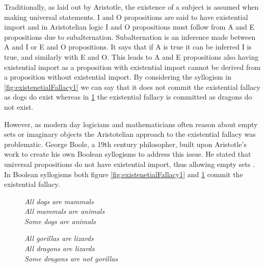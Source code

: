 \documentclass[12pt,a4paper]{report}
\newenvironment{tightcenter}{%
  \setlength\topsep{0pt}
  \setlength\parskip{0pt}
  \begin{center}
}{%
  \end{center}
}
\begin{document}
Traditionally, as laid out by Aristotle, the existence of a subject is assumed when making universal statements. I and O propositions are said to have existential import and in Aristotelian logic I and O propositions must follow from A and E propositions due to subalternation. Subalternation is an inference made between A and I or E and O propositions. It says that if A is true it can be inferred I is true, and similarly with E and O. This leads to A and E propositions also having existential import as a proposition with existential import cannot be derived from a proposition without existential import.
By considering the syllogism in \ref{fig:existenetialFallacy1} we can say that it does not commit the existential fallacy as dogs do exist whereas in \ref{fig:existenetialFallacy2} the existential fallacy is committed as dragons do not exist. 

However, as modern day logicians and mathematicians often reason about empty sets or imaginary objects the Aristotelian approach to the existential fallacy was problematic. George Boole, a 19th century philosopher, built upon Aristotle's work to create his own Boolean syllogisms to address this issue. He stated that universal propositions do not have existential import, thus allowing empty sets \citep{hammerhill}. In Boolean syllogisms both figure \ref{fig:existenetialFallacy1} and \ref{fig:existenetialFallacy2} commit the existential fallacy.


\begin{figure}[!h]
  \centering
  \begin{minipage}[b]{0.4\textwidth}
    \begin{tightcenter}
		\textit{All dogs are mammals }\\ 
		\textit{All mammals are animals}\\
		\textit{Some dogs are animals}\\
		\end{tightcenter}
		    \caption{}
		    \label{fig:existenetialFallacy1}
  \end{minipage}
  \hfill
  \begin{minipage}[b]{0.4\textwidth}
    \begin{tightcenter}
		\textit{All gorillas are lizards }\\ 
		\textit{All dragons are lizards}\\
		\textit{Some dragons are not gorillas}\\
		\end{tightcenter}
				    \caption{}
		    \label{fig:existenetialFallacy2}
  \end{minipage}
\end{figure}
\FloatBarrier
\end{document}
